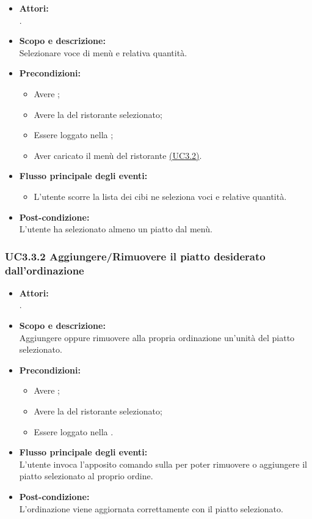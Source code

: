 \begin{itemize}
	\item \textbf{Attori:}
	\\.
	\item \textbf{Scopo e descrizione:} 
	\\Selezionare voce di menù e relativa quantità.
	\item \textbf{Precondizioni:}
	\begin{itemize}
		\item Avere ;
		\item Avere la  del ristorante selezionato;
		\item Essere loggato nella ;
		\item Aver caricato il menù del ristorante \hyperref[UC3.2]{(UC3.2)}.
	\end{itemize}
	\item \textbf{Flusso principale degli eventi:}
	\begin{itemize}
		\item L'utente scorre la lista dei cibi ne seleziona voci e relative quantità.
	\end{itemize}
	\item \textbf{Post-condizione:}
	\\L'utente ha selezionato almeno un piatto dal menù.
\end{itemize}

\subsubsection{UC3.3.2 Aggiungere/Rimuovere il piatto desiderato dall'ordinazione} \label{UC3.3.2}

\begin{itemize}
	\item \textbf{Attori:}
	\\.
	\item \textbf{Scopo e descrizione:} 
	\\Aggiungere oppure rimuovere alla propria ordinazione un'unità del piatto selezionato.
	\item \textbf{Precondizioni:}
	\begin{itemize}
		\item Avere ;
		\item Avere la  del ristorante selezionato;
		\item Essere loggato nella .
	\end{itemize}
	\item \textbf{Flusso principale degli eventi:}
	\\L'utente invoca l'apposito comando sulla  per poter rimuovere o aggiungere il piatto selezionato al proprio ordine.
	\item \textbf{Post-condizione:}
	\\L'ordinazione viene aggiornata correttamente con il piatto selezionato.
\end{itemize}

